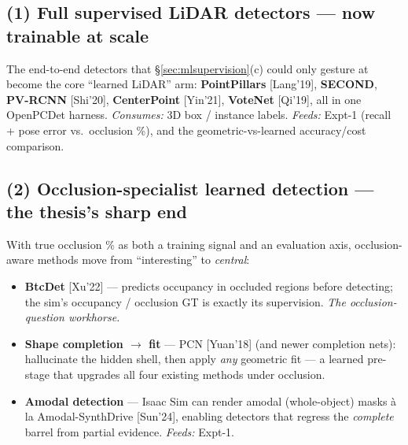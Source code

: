 \documentclass[10pt,a4paper]{article}
\begin{document}
\subsection{(1) Full supervised LiDAR detectors --- now trainable at scale}
The end-to-end detectors that \S\ref{sec:mlsupervision}(c) could only gesture at become the
core ``learned LiDAR'' arm: \textbf{PointPillars} [Lang'19], \textbf{SECOND},
\textbf{PV-RCNN} [Shi'20], \textbf{CenterPoint} [Yin'21], \textbf{VoteNet} [Qi'19], all in one
OpenPCDet harness. \emph{Consumes:} 3D box / instance labels. \emph{Feeds:} Expt-1 (recall +
pose error vs.\ occlusion \%), and the geometric-vs-learned accuracy/cost comparison.

\subsection{(2) Occlusion-specialist learned detection --- the thesis's sharp end}
With true occlusion \% as both a training signal and an evaluation axis, occlusion-aware
methods move from ``interesting'' to \emph{central}:
\begin{itemize}[leftmargin=1.4em,itemsep=2pt,topsep=2pt]
  \item \textbf{BtcDet} [Xu'22] --- predicts occupancy in occluded regions before detecting;
  the sim's occupancy / occlusion GT is exactly its supervision. \emph{The occlusion-question
  workhorse.}
  \item \textbf{Shape completion $\to$ fit} --- PCN [Yuan'18] (and newer completion nets):
  hallucinate the hidden shell, then apply \emph{any} geometric fit --- a learned pre-stage
  that upgrades all four existing methods under occlusion.
  \item \textbf{Amodal detection} --- Isaac Sim can render amodal (whole-object) masks à la
  Amodal-SynthDrive [Sun'24], enabling detectors that regress the \emph{complete} barrel from
  partial evidence. \emph{Feeds:} Expt-1.
\end{itemize}
\end{document}
